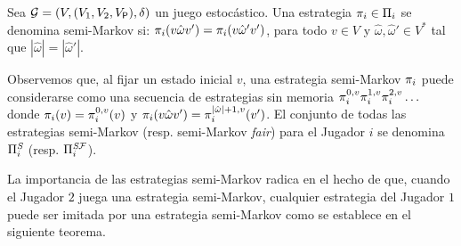 \begin{definition}\label{def:semimarkov:strategy} Sea $\mathcal{G} = (V, (V_1, V_2, V_{\mathsf{P}}), \delta)$ un juego estocástico. Una estrategia $\pi_{i} \in \Pi_{i}$ se denomina semi-Markov si: $\pi_{i}(v \hat{\omega}v') = \pi_{i}(v \hat{\omega}'v')$, para todo $v \in V$ y $\hat{\omega}, \hat{\omega}' \in V^*$ tal que $|\hat{\omega}|=|\hat{\omega}'|$. 
\end{definition}

Observemos que, al fijar un estado inicial $v$, una estrategia semi-Markov $\pi_{i}$ puede considerarse como una secuencia de estrategias sin memoria $\pi_{i}^{0,v}\pi_{i }^{1,v}\pi_{i}^{2,v}\ldots$ donde $\pi_{i}(v)=\pi_{i}^{0,v}(v)$ y $\pi_{i}(v\hat{\omega}v')=\pi_{i}^{|\hat{\omega}|+1,v}(v')$. El conjunto de todas las estrategias semi-Markov (resp. semi-Markov \textit{fair}) para el Jugador $i$ se denomina $\Pi^{\textit{S}}_{i}$ (resp. $\Pi^{\textit{S}\mathcal{F}}_{i}$).

La importancia de las estrategias semi-Markov radica en el hecho de que, cuando el Jugador $2$ juega una estrategia semi-Markov, cualquier estrategia del Jugador $1$ puede ser imitada por una estrategia semi-Markov como se establece en el siguiente teorema.

